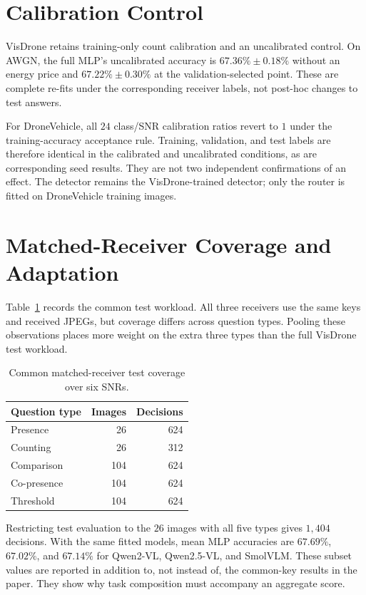 \documentclass[12pt,lettersize,journal,onecolumn]{IEEEtran}
\begin{document}
\section{Calibration Control}
VisDrone retains training-only count calibration and an uncalibrated
control. On AWGN, the full MLP's uncalibrated accuracy is
$67.36\%\pm0.18\%$ without an energy price and
$67.22\%\pm0.30\%$ at the validation-selected point.
These are complete re-fits under the corresponding receiver labels,
not post-hoc changes to test answers.

For DroneVehicle, all $24$ class/SNR calibration ratios revert to
$1$ under the training-accuracy acceptance rule. Training, validation,
and test labels are therefore identical in the calibrated and
uncalibrated conditions, as are corresponding seed results.
They are not two independent confirmations of an effect.
The detector remains the VisDrone-trained detector; only the router
is fitted on DroneVehicle training images.

\section{Matched-Receiver Coverage and Adaptation}
Table~\ref{tab:coverage} records the common test workload.
All three receivers use the same keys and received JPEGs, but
coverage differs across question types. Pooling these observations
places more weight on the extra three types than the full VisDrone
test workload.

\begin{table}[t]\centering
\caption{Common matched-receiver test coverage over six SNRs.}
\label{tab:coverage}
\begin{tabular}{@{}lrr@{}}\toprule
Question type & Images & Decisions\\\midrule
Presence & 26 & 624\\
Counting & 26 & 312\\
Comparison & 104 & 624\\
Co-presence & 104 & 624\\
Threshold & 104 & 624\\
\bottomrule\end{tabular}
\end{table}

Restricting test evaluation to the $26$ images with all five types
gives $1{,}404$ decisions. With the same fitted models, mean MLP
accuracies are $67.69\%$, $67.02\%$, and $67.14\%$ for Qwen2-VL,
Qwen2.5-VL, and SmolVLM. These subset values are reported in
addition to, not instead of, the common-key results in the paper.
They show why task composition must accompany an aggregate score.
\end{document}
